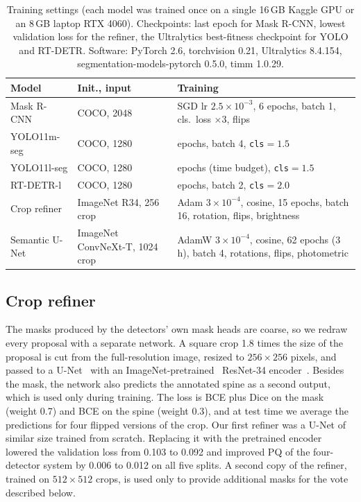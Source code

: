 \documentclass[conference]{IEEEtran}
\begin{document}
\begin{table}[t]
\centering
\caption{Training settings (each model was trained once on a single 16\,GB Kaggle GPU or an 8\,GB laptop RTX 4060). Checkpoints: last epoch for Mask R-CNN, lowest validation loss for the refiner, the Ultralytics best-fitness checkpoint for YOLO and RT-DETR. Software: PyTorch 2.6, torchvision 0.21, Ultralytics 8.4.154, segmentation-models-pytorch 0.5.0, timm 1.0.29.}
\label{tab:train}
\setlength{\tabcolsep}{2.5pt}
\footnotesize
\begin{tabular}{>{\raggedright\arraybackslash}p{1.75cm}>{\raggedright\arraybackslash}p{1.75cm}>{\raggedright\arraybackslash}p{4.6cm}}
\toprule
Model & Init., input & Training \\
\midrule
Mask R-CNN & COCO, 2048 & SGD lr $2.5{\times}10^{-3}$, 6 epochs, batch 1, cls.\ loss $\times3$, flips \\
YOLO11m-seg & COCO, 1280 & 40 epochs, batch 4, \texttt{cls}$=1.5$ \\
YOLO11l-seg & COCO, 1280 & 103 epochs (time budget), \texttt{cls}$=1.5$ \\
RT-DETR-l & COCO, 1280 & 60 epochs, batch 2, \texttt{cls}$=2.0$ \\
Crop refiner & ImageNet R34, 256 crop & Adam $3{\times}10^{-4}$, cosine, 15 epochs, batch 16, rotation, flips, brightness \\
Semantic U-Net & ImageNet ConvNeXt-T, 1024 crop & AdamW $3{\times}10^{-4}$, cosine, 62 epochs (3\,h), batch 4, rotations, flips, photometric \\
\bottomrule
\end{tabular}
\end{table}

\subsection{Crop refiner}
The masks produced by the detectors' own mask heads are coarse, so we redraw every proposal with a separate network. A square crop 1.8 times the size of the proposal is cut from the full-resolution image, resized to $256\times256$ pixels, and passed to a U-Net~\cite{ronneberger2015unet} with an ImageNet-pretrained~\cite{deng2009imagenet} ResNet-34 encoder~\cite{he2016resnet,iakubovskii2019smp}. Besides the mask, the network also predicts the annotated spine as a second output, which is used only during training. The loss is BCE plus Dice on the mask (weight 0.7) and BCE on the spine (weight 0.3), and at test time we average the predictions for four flipped versions of the crop. Our first refiner was a U-Net of similar size trained from scratch. Replacing it with the pretrained encoder lowered the validation loss from 0.103 to 0.092 and improved PQ of the four-detector system by 0.006 to 0.012 on all five splits. A second copy of the refiner, trained on $512\times512$ crops, is used only to provide additional masks for the vote described below.
\end{document}
